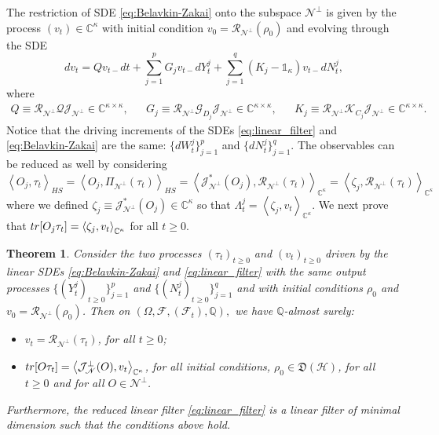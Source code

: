 \documentclass[aihp,12pt]{imsart}
\newcommand{\Gc}{\mathcal{G}}
\newcommand{\Hc}{\mathcal{H}}
\newcommand{\Jc}{\mathcal{J}}
\newcommand{\Rc}{\mathcal{R}}
\newcommand{\Qc}{\mathcal{Q}}
\newcommand{\Kc}{\mathcal{K}}
\newcommand{\Ns}{\mathscr{N}}
\newcommand{\Cb}{\mathbb{C}}
\newcommand{\Df}{\mathfrak{D}}
\newcommand{\one}{\mathbb{1}}
\newcommand{\tr}{{\rm tr}}
\newcommand{\inner}[2]{\left< #1,#2 \right>}
\theoremstyle{theorem}
\newtheorem{theorem}{Theorem}
\theoremstyle{definition}
\theoremstyle{remark}
\begin{document}
The restriction of SDE \eqref{eq:Belavkin-Zakai} onto the subspace $\Ns^\perp$ is given by the process $(v_t)\in\Cb^\kappa$ with initial condition $v_0=\Rc_{\Ns^\perp}(\rho_0)$ and evolving through the SDE
\begin{equation}
        dv_t = Q v_{t-} dt + \sum_{j=1}^p G_j v_{t-} dY_t^j + \sum_{j=1}^q (K_j-\one_\kappa) v_{t-} dN_t^j,
    \label{eq:linear_filter}
\end{equation}
where 
\begin{align}
    Q \equiv \Rc_{\Ns^\perp} {\Qc}\Jc_{\Ns^\perp}\in\Cb^{\kappa \times \kappa}, && 
    G_j \equiv \Rc_{\Ns^\perp}\Gc_{D_j}\Jc_{\Ns^\perp}\in\Cb^{\kappa \times \kappa}, && 
    K_j \equiv \Rc_{\Ns^\perp}\Kc_{C_j}\Jc_{\Ns^\perp}\in\Cb^{\kappa \times \kappa}.
    \label{eq:reduced_op_linear}
\end{align}
Notice that the driving increments of the SDEs \eqref{eq:linear_filter} and \eqref{eq:Belavkin-Zakai} are the same: $\{dW_t^j\}_{j=1}^p$ and $\{dN_t^j\}_{j=1}^{q}$. 
The observables can be reduced as well by considering \[\inner{O_j}{\tau_t}_{HS} = \inner{O_j}{\Pi_{\Ns^\perp}(\tau_t)}_{HS} = \inner{\Jc_{\Ns^\perp}^*(O_j)}{\Rc_{\Ns^\perp}(\tau_t)}_{\Cb^\kappa} =  \inner{\zeta_j}{\Rc_{\Ns^\perp}(\tau_t)}_{\Cb^\kappa}\]
where we defined $\zeta_j \equiv \Jc_{\Ns^\perp}^*(O_j)\in\Cb^\kappa$ so that $\Lambda_t^j=\inner{\zeta_j}{v_{t}}_{\Cb^\kappa}$.
We next prove that $\tr[O_j\tau_t] = \inner{\zeta_j}{v_t}_{\Cb^\kappa}$ for all $t\geq0$.
\begin{theorem}
\label{thm:linear_filter_reduction}
    Consider the two processes $(\tau_t)_{t\geq0}$ and $(v_t)_{t\geq0}$ driven by the linear SDEs \eqref{eq:Belavkin-Zakai} and \eqref{eq:linear_filter} with the same output processes $\{(Y_t^j)_{t\geq0}\}_{j=1}^p$ and $\{(N_t^j)_{t\geq0}\}_{j=1}^q$ and with initial conditions $\rho_0$ and $v_0=\Rc_{\Ns^\perp}(\rho_0)$. Then on $(\Omega,\mathcal F,(\mathcal F_t),\mathbb Q),$ we have $\mathbb{Q}$-almost surely:
    \begin{itemize}
        \item $v_t=\Rc_{\Ns^\perp}(\tau_t)$, for all $t\geq0$;
        \item $\tr[O\tau_t] = \inner{\Jc_{\Ns}^\perp(O)}{v_t}_{\Cb^\kappa}$, for all initial conditions, $\rho_0\in\Df(\Hc)$, for all $t\geq0$ and for all $O\in\Ns^\perp$. 
    \end{itemize} 

    Furthermore, the reduced linear filter \eqref{eq:linear_filter} is a linear filter of minimal dimension such that the  conditions above hold.
\end{theorem}
\end{document}
